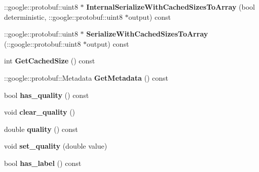 \begin{DoxyCompactItemize}
\item 
\hypertarget{classstruct_definitions_1_1_properties_afde4673bf6a490e27de122b63c18932d}{}\label{classstruct_definitions_1_1_properties_afde4673bf6a490e27de122b63c18932d} 
\+::google\+::protobuf\+::uint8 $\ast$ {\bfseries Internal\+Serialize\+With\+Cached\+Sizes\+To\+Array} (bool deterministic, \+::google\+::protobuf\+::uint8 $\ast$output) const
\item 
\hypertarget{classstruct_definitions_1_1_properties_a287000409151221e0e476076cbea3e7c}{}\label{classstruct_definitions_1_1_properties_a287000409151221e0e476076cbea3e7c} 
\+::google\+::protobuf\+::uint8 $\ast$ {\bfseries Serialize\+With\+Cached\+Sizes\+To\+Array} (\+::google\+::protobuf\+::uint8 $\ast$output) const
\item 
\hypertarget{classstruct_definitions_1_1_properties_a97c57440751cf0c01848fd269f8ffdde}{}\label{classstruct_definitions_1_1_properties_a97c57440751cf0c01848fd269f8ffdde} 
int {\bfseries Get\+Cached\+Size} () const
\item 
\hypertarget{classstruct_definitions_1_1_properties_ae7b92b4f3e0090c839e20b6ea119410a}{}\label{classstruct_definitions_1_1_properties_ae7b92b4f3e0090c839e20b6ea119410a} 
\+::google\+::protobuf\+::\+Metadata {\bfseries Get\+Metadata} () const
\item 
\hypertarget{classstruct_definitions_1_1_properties_a27140b7689b30ffee120c6acb8f66528}{}\label{classstruct_definitions_1_1_properties_a27140b7689b30ffee120c6acb8f66528} 
bool {\bfseries has\+\_\+quality} () const
\item 
\hypertarget{classstruct_definitions_1_1_properties_a5e1591ad635159c0e1351106a7c9aa5a}{}\label{classstruct_definitions_1_1_properties_a5e1591ad635159c0e1351106a7c9aa5a} 
void {\bfseries clear\+\_\+quality} ()
\item 
\hypertarget{classstruct_definitions_1_1_properties_a29c4c3655ea6fa9ee705470d6f371112}{}\label{classstruct_definitions_1_1_properties_a29c4c3655ea6fa9ee705470d6f371112} 
double {\bfseries quality} () const
\item 
\hypertarget{classstruct_definitions_1_1_properties_a5b72f0b58727a9a1482739563449eb7c}{}\label{classstruct_definitions_1_1_properties_a5b72f0b58727a9a1482739563449eb7c} 
void {\bfseries set\+\_\+quality} (double value)
\item 
\hypertarget{classstruct_definitions_1_1_properties_a3d1789c09df84e40e7fc6c814b6405aa}{}\label{classstruct_definitions_1_1_properties_a3d1789c09df84e40e7fc6c814b6405aa} 
bool {\bfseries has\+\_\+label} () const
\item 

\end{DoxyCompactItemize}
